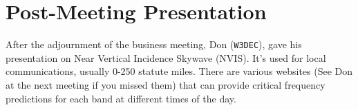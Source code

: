 \documentclass[10pt,letterpaper]{article}
\begin{document}
\section{Post-Meeting Presentation}

After the adjournment of the business meeting, Don (\texttt{W3DEC}), gave his presentation on Near Vertical Incidence Skywave (NVIS). It's used for local communications, usually 0-250 statute miles. There are various websites (See Don at the next meeting if you missed them) that can provide critical frequency predictions for each band at different times of the day.
\end{document}
